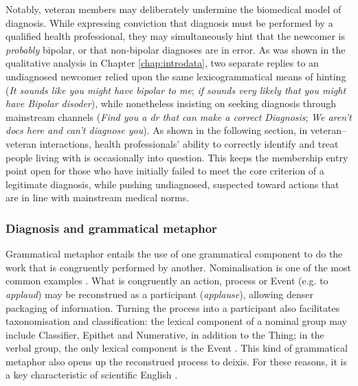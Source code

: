 
Notably, veteran \glspl{member} may deliberately undermine the biomedical model of diagnosis. While expressing conviction that diagnosis must be performed by a qualified health professional, they may simultaneously hint that the newcomer is \emph{probably} bipolar, or that non\hyp{}bipolar diagnoses are in error. As was shown in the qualitative analysis in Chapter \ref{chap:introdata}, two separate replies to an undiagnosed newcomer relied upon the same lexicogrammatical means of hinting (\emph{It sounds like you might have bipolar to me}; \emph{if sounds very likely that you might have Bipolar disoder}), while nonetheless insisting on seeking diagnosis through mainstream channels (\emph{Find you a dr that can make a correct Diagnosis}; \emph{We aren't docs here and can't diagnose you}). As shown in the following section, in veteran--veteran interactions, health professionals' ability to correctly identify and treat people living with  is occasionally into question. This keeps the membership entry point open for those who have initially failed to meet the core criterion of a legitimate diagnosis, while pushing undiagnosed, suspected   toward actions that are in line with mainstream medical norms. %

\subsubsection{Diagnosis and grammatical metaphor}

Grammatical metaphor entails the use of one grammatical component to do the work that is congruently performed by another. Nominalisation is one of the most common examples \cite{simon-vandenbergen_grammatical_2003}. What is congruently an action, process or Event (e.g. to \emph{applaud}) may be reconstrued as a participant (\emph{applause}), allowing denser packaging of information. Turning the process into a participant also facilitates taxonomisation and classification: the lexical component of a nominal group may include Classifier, Epithet and Numerative, in addition to the Thing; in the verbal group, the only lexical component is the Event \cite{halliday_introduction_2004}. This kind of grammatical metaphor also opens up the reconstrued process to deixis. For these reasons, it is a key characteristic of scientific English \cite{halliday1999construing}. 

